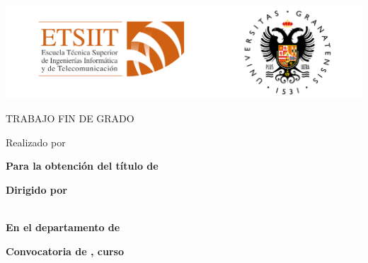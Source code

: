 \thispagestyle{empty} %
\begin{center}

\vspace*{0.5cm}

\includegraphics[width=\textwidth]{figures/etsiit_ugr_logo.png}

\vspace*{1.5cm}
\begin{large}
TRABAJO FIN DE GRADO
\end{large}

\vspace*{0.1in}
\textbf{\huge \tfgTitle}

\vspace*{.2in}

{\large Realizado por}\\
\textbf{\Large \tfgAuthors}

\vspace*{3cm}

\textbf{Para la obtención del título de}\\
{\large \tfgDegree}

\vspace*{0.2in}

\textbf{Dirigido por}\\
{\large \tfgSupervisor}\\

\vspace*{0.2in}

\textbf{En el departamento de}\\
{\large \tfgDepartment}

\vspace*{.6in}
\textbf{\Large Convocatoria de \tfgMonth, curso \tfgYear}

\end{center}

\ifdefined\tfgDedication
    \newpage
    \thispagestyle{empty}
    
    \vspace*{\fill}
    \begin{center}
    \textit{\tfgDedication}
    \end{center}
    \vspace*{\fill}
\fi

\clearpage\setcounter{page}{1} %
